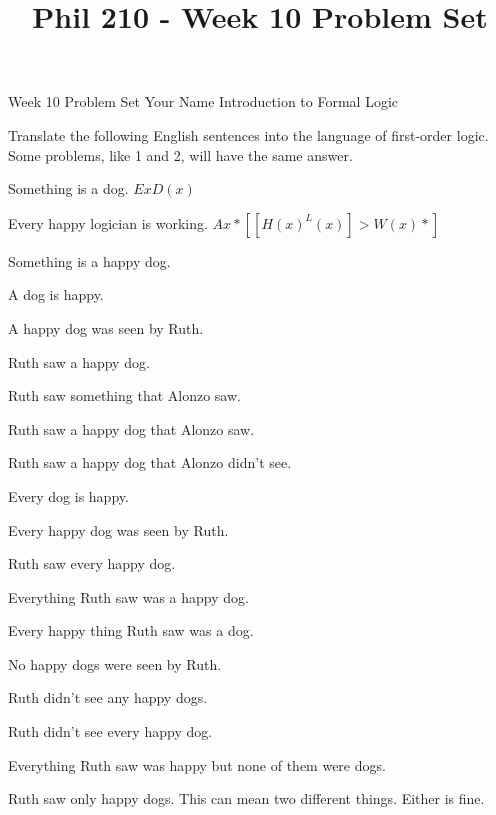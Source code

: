 
\title{Phil 210 - Week 10 Problem Set}

\heading
Week 10 Problem Set
Your Name
Introduction to Formal Logic
\endheading

Translate the following English sentences into the language of first-order logic. Some problems, like 1 and 2, will have the same answer.

\quantifiers
\problems
{}
Something is a dog.
	\answer 
	$ Ex D(x) $
	\endanswer\Bigskip

Every happy logician is working.
	\answer 
	$ Ax*[[H(x) ^ L(x)] > W(x)*] $
	\endanswer

Something is a happy dog.
	\answer
	$ $
	\endanswer

A dog is happy.
	\answer
	$ $
	\endanswer

A happy dog was seen by Ruth.
	\answer
	$ $
	\endanswer

Ruth saw a happy dog.
	\answer
	$ $
	\endanswer

Ruth saw something that Alonzo saw.
	\answer
	$ $
	\endanswer

Ruth saw a happy dog that Alonzo saw.
	\answer
	$ $
	\endanswer

Ruth saw a happy dog that Alonzo didn't see.
	\answer
	$ $
	\endanswer

Every dog is happy.
	\answer
	$ $
	\endanswer

Every happy dog was seen by Ruth.
	\answer
	$ $
	\endanswer

Ruth saw every happy dog.
	\answer
	$ $
	\endanswer

Everything Ruth saw was a happy dog.
	\answer
	$ $
	\endanswer

Every happy thing Ruth saw was a dog.
	\answer
	$ $
	\endanswer

No happy dogs were seen by Ruth.
	\answer
	$ $
	\endanswer

Ruth didn't see any happy dogs.
	\answer
	$ $
	\endanswer

Ruth didn't see every happy dog.
	\answer
	$ $
	\endanswer

Everything Ruth saw was happy but none of them were dogs.
	\answer
	$ $
	\endanswer

Ruth saw only happy dogs.
\Hint This can mean two different things. Either is fine.
	\answer
	$ $
	\endanswer

